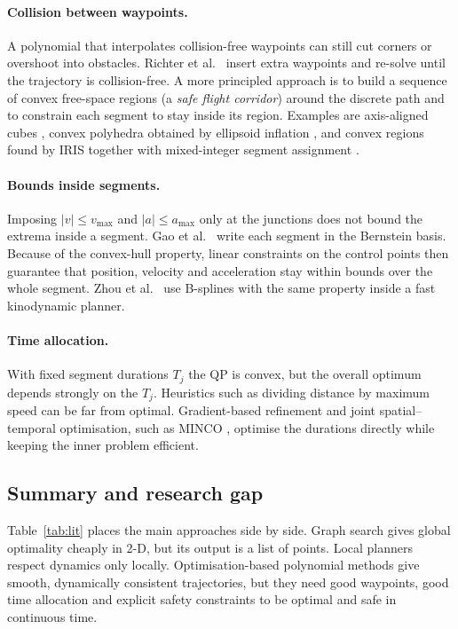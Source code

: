 \documentclass[11pt,a4paper]{article}
\begin{document}
\paragraph{Collision between waypoints.} A polynomial that interpolates
collision-free waypoints can still cut corners or overshoot into obstacles.
Richter et al.\ \citep{richter2016polynomial} insert extra waypoints and
re-solve until the trajectory is collision-free. A more principled approach
is to build a sequence of convex free-space regions (a \emph{safe flight
corridor}) around the discrete path and to constrain each segment to stay
inside its region. Examples are axis-aligned cubes \citep{chen2016online},
convex polyhedra obtained by ellipsoid inflation \citep{liu2017planning}, and
convex regions found by IRIS together with mixed-integer segment assignment
\citep{deits2015efficient}.

\paragraph{Bounds inside segments.} Imposing $|v|\le v_{\max}$ and
$|a|\le a_{\max}$ only at the junctions does not bound the extrema inside a
segment. Gao et al.\ \citep{gao2018online} write each segment in the
Bernstein basis. Because of the convex-hull property, linear constraints on
the control points then guarantee that position, velocity and acceleration
stay within bounds over the whole segment. Zhou et al.\
\citep{zhou2019robust} use B-splines with the same property inside a fast
kinodynamic planner.

\paragraph{Time allocation.} With fixed segment durations $T_j$ the QP is
convex, but the overall optimum depends strongly on the $T_j$. Heuristics
such as dividing distance by maximum speed can be far from optimal.
Gradient-based refinement \citep{richter2016polynomial} and joint
spatial--temporal optimisation, such as MINCO \citep{wang2022geometrically},
optimise the durations directly while keeping the inner problem efficient.

\subsection{Summary and research gap}
\label{sec:lit-gap}

Table~\ref{tab:lit} places the main approaches side by side. Graph search
gives global optimality cheaply in 2-D, but its output is a list of points.
Local planners respect dynamics only locally. Optimisation-based polynomial
methods give smooth, dynamically consistent trajectories, but they need good
waypoints, good time allocation and explicit safety constraints to be
optimal and safe in continuous time.
\end{document}
